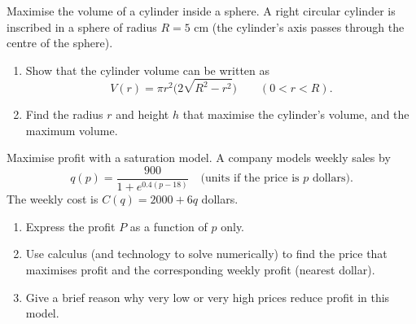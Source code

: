 \documentclass[11pt]{article}
\def\textbf#1{#1}%
\newcounter{question}
\begin{document}
\begin{question}
\textbf{Maximise the volume of a cylinder inside a sphere.}
A right circular cylinder is inscribed in a sphere of radius $R=5$ cm (the cylinder’s axis passes through the centre of the sphere).
\begin{enumerate}
  \item Show that the cylinder volume can be written as
  \[
    V(r)=\pi r^2\Big(2\sqrt{R^2-r^2}\Big)\qquad (0<r<R).
  \]
  \item Find the radius $r$ and height $h$ that maximise the cylinder’s volume, and the maximum volume.
\end{enumerate}

\begin{center}
\end{center}
\end{question}

\begin{question}
\textbf{Maximise profit with a saturation model.}
A company models weekly sales by
\[
q(p)=\frac{900}{1+e^{0.4(p-18)}}\quad\text{(units if the price is $p$ dollars).}
\]
The weekly cost is $C(q)=2000+6q$ dollars.
\begin{enumerate}
  \item Express the profit $P$ as a function of $p$ only.
  \item Use calculus (and technology to solve numerically) to find the price that maximises profit and the corresponding weekly profit (nearest dollar).
  \item Give a brief reason why very low or very high prices reduce profit in this model.
\end{enumerate}

\begin{center}
\end{center}
\end{question}
\end{document}
